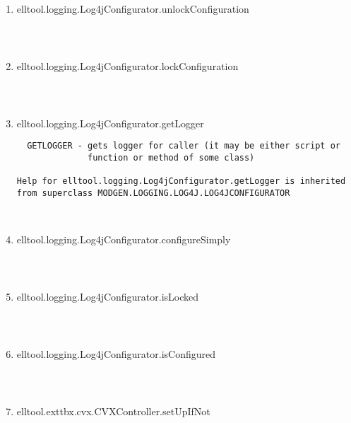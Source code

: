 \begin{enumerate}
\begin{lstlisting}
\end{lstlisting}
\fontfamily{\familydefault}
\selectfont
\item {elltool.logging.Log4jConfigurator.unlockConfiguration}
\selectfont
\begin{lstlisting}



\end{lstlisting}
\fontfamily{\familydefault}
\selectfont
\item {elltool.logging.Log4jConfigurator.lockConfiguration}
\selectfont
\begin{lstlisting}



\end{lstlisting}
\fontfamily{\familydefault}
\selectfont
\item {elltool.logging.Log4jConfigurator.getLogger}
\selectfont
\begin{lstlisting}
  GETLOGGER - gets logger for caller (it may be either script or
              function or method of some class)

Help for elltool.logging.Log4jConfigurator.getLogger is inherited from superclass MODGEN.LOGGING.LOG4J.LOG4JCONFIGURATOR



\end{lstlisting}
\fontfamily{\familydefault}
\selectfont
\item {elltool.logging.Log4jConfigurator.configureSimply}
\selectfont
\begin{lstlisting}



\end{lstlisting}
\fontfamily{\familydefault}
\selectfont
\item {elltool.logging.Log4jConfigurator.isLocked}
\selectfont
\begin{lstlisting}



\end{lstlisting}
\fontfamily{\familydefault}
\selectfont
\item {elltool.logging.Log4jConfigurator.isConfigured}
\selectfont
\begin{lstlisting}



\end{lstlisting}
\fontfamily{\familydefault}
\selectfont
\item {elltool.exttbx.cvx.CVXController.setUpIfNot}
\selectfont
\begin{lstlisting}




\end{lstlisting}
\end{enumerate}
